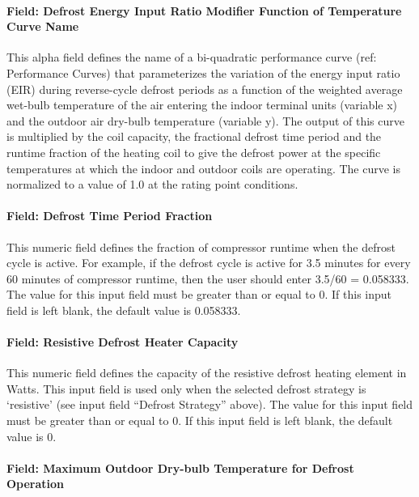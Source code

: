 \paragraph{Field: Defrost Energy Input Ratio Modifier Function of Temperature Curve Name}\label{field-defrost-energy-input-ratio-modifier-function-of-temperature-curve-name}

This alpha field defines the name of a bi-quadratic performance curve (ref: Performance Curves) that parameterizes the variation of the energy input ratio (EIR) during reverse-cycle defrost periods as a function of the weighted average wet-bulb temperature of the air entering the indoor terminal units (variable x) and the outdoor air dry-bulb temperature (variable y). The output of this curve is multiplied by the coil capacity, the fractional defrost time period and the runtime fraction of the heating coil to give the defrost power at the specific temperatures at which the indoor and outdoor coils are operating. The curve is normalized to a value of 1.0 at the rating point conditions.

\paragraph{Field: Defrost Time Period Fraction}\label{field-defrost-time-period-fraction-001}

This numeric field defines the fraction of compressor runtime when the defrost cycle is active. For example, if the defrost cycle is active for 3.5 minutes for every 60 minutes of compressor runtime, then the user should enter 3.5/60 = 0.058333. The value for this input field must be greater than or equal to 0. If this input field is left blank, the default value is 0.058333.

\paragraph{Field: Resistive Defrost Heater Capacity}\label{field-resistive-defrost-heater-capacity-001}

This numeric field defines the capacity of the resistive defrost heating element in Watts. This input field is used only when the selected defrost strategy is `resistive' (see input field ``Defrost Strategy'' above). The value for this input field must be greater than or equal to 0. If this input field is left blank, the default value is 0.

\paragraph{Field: Maximum Outdoor Dry-bulb Temperature for Defrost Operation}\label{field-maximum-outdoor-dry-bulb-temperature-for-defrost-operation-001}

